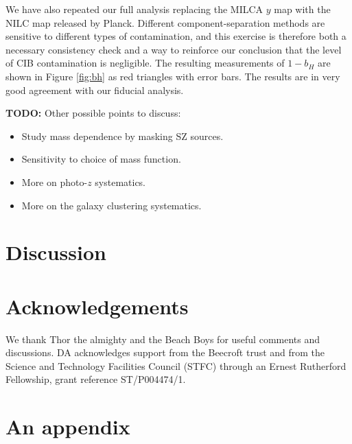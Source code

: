 \documentclass[useAMS,usenatbib]{mn2e}
\newcommand{\todo}[1]{{\bf TODO:} #1}
\begin{document}
      We have also repeated our full analysis replacing the MILCA $y$ map with the NILC map released by Planck. Different component-separation methods are sensitive to different types of contamination, and this exercise is therefore both a necessary consistency check and a way to reinforce our conclusion that the level of CIB contamination is negligible. The resulting measurements of $1-b_H$ are shown in Figure \ref{fig:bh} as red triangles with error bars. The results are in very good agreement with our fiducial analysis.

      
      \todo{Other possible points to discuss:
      \begin{itemize}
        \item Study mass dependence by masking SZ sources.
        \item Sensitivity to choice of mass function.
        \item More on photo-$z$ systematics.
        \item More on the galaxy clustering systematics.
      \end{itemize}
      }



\section{Discussion}\label{sec:discussion}
  \lipsum[2]

\section*{Acknowledgements}
  We thank Thor the almighty and the Beach Boys for useful comments and discussions. DA acknowledges support from the Beecroft trust and from the Science and Technology Facilities Council (STFC) through an Ernest Rutherford Fellowship, grant reference ST/P004474/1.
  
\setlength{\bibhang}{2.0em}
\setlength{}


\appendix
\section{An appendix}\label{app:app}
  \lipsum[3]
\end{document}
